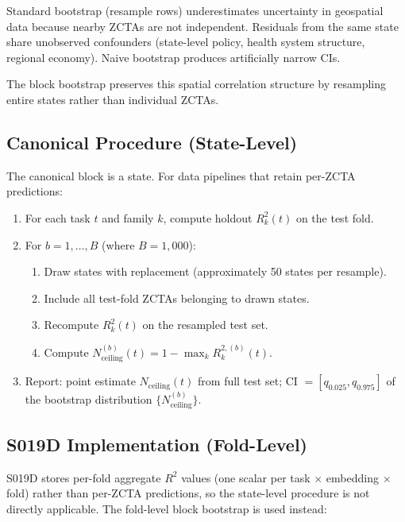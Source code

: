 \documentclass{article}
\begin{document}
Standard bootstrap (resample rows) underestimates uncertainty in geospatial data because nearby ZCTAs are not independent. Residuals from the same state share unobserved confounders (state-level policy, health system structure, regional economy). Naive bootstrap produces artificially narrow CIs.

The block bootstrap preserves this spatial correlation structure by resampling entire states rather than individual ZCTAs.

\subsection{Canonical Procedure (State-Level)}

The canonical block is a state. For data pipelines that retain per-ZCTA predictions:

\begin{enumerate}
\item For each task $t$ and family $k$, compute holdout $R^2_k(t)$ on the test fold.
\item For $b = 1, \ldots, B$ (where $B{=}1{,}000$):
\begin{enumerate}
\item Draw states with replacement (approximately 50 states per resample).
\item Include all test-fold ZCTAs belonging to drawn states.
\item Recompute $R^2_k(t)$ on the resampled test set.
\item Compute $N^{(b)}_{\text{ceiling}}(t) = 1 - \max_k R^{2,(b)}_k(t)$.
\end{enumerate}
\item Report: point estimate $N_{\text{ceiling}}(t)$ from full test set; CI $= [q_{0.025}, q_{0.975}]$ of the bootstrap distribution $\{N^{(b)}_{\text{ceiling}}\}$.
\end{enumerate}

\subsection{S019D Implementation (Fold-Level)}

S019D stores per-fold aggregate $R^2$ values (one scalar per task $\times$ embedding $\times$ fold) rather than per-ZCTA predictions, so the state-level procedure is not directly applicable. The fold-level block bootstrap is used instead:
\end{document}
